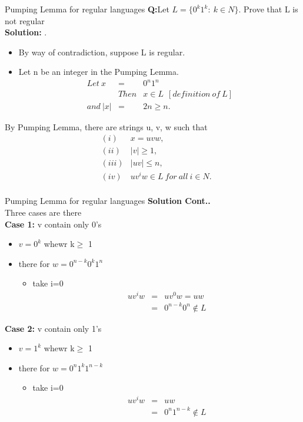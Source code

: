 \documentclass{beamer}
\begin{document}
\begin{frame}{Pumping Lemma for regular languages }
	\textbf{Q:}Let  $L= \{0^k1^k:\  k \in N\}.$ Prove that L is not regular\\
	\textbf{Solution:}
.	\begin{itemize}
		\item By way of contradiction, suppose L is regular.
		\item Let n be an integer in the Pumping Lemma.
		\begin{eqnarray*}
			Let\  x &=& 0^n1^n\\
			&Then&  x \in L\ \  [definition \ of\  L] \\
			and\  |x| &=&2n \geq n.
		\end{eqnarray*}
	\end{itemize}
By Pumping Lemma, there are strings u, v, w such that
\begin{eqnarray*}
	&(i)& x = uvw,\\
	&(ii)& |v|\geq 1 ,\\
	&(iii)& |uv| \leq n,\\
	&(iv)& uv^iw \in L\  for\  all\  i \in N.
\\
\end{eqnarray*}
\end{frame}
\begin{frame}{Pumping Lemma for regular languages }
	\textbf{Solution Cont..}
	\\ Three cases are there  \\
	\textbf{Case 1:} v contain only 0's
	\begin{itemize}
		\item $v=0^k$  whewr  k$\geq$ 1
		\item there for $w=0^{n-k}0^k1^n$
		\begin{itemize}
			\item take i=0
			\begin{eqnarray*}
				uv^iw &=&uv^0w = uw\\
				&=&0^{n-k}0^n \notin L
			\end{eqnarray*}
		\end{itemize}
	\end{itemize}
	\textbf{Case 2:} v contain only 1's
	\begin{itemize}
		\item $v=1^k$  whewr  k$\geq$ 1
		\item there for $w=0^n1^k1^{n-k}$
		\begin{itemize}
			\item take i=0
			\begin{eqnarray*}
				uv^iw &=& uw\\
				&=&0^n1^{n-k} \notin L
			\end{eqnarray*}
		\end{itemize}
	\end{itemize}
\end{frame}
\end{document}
